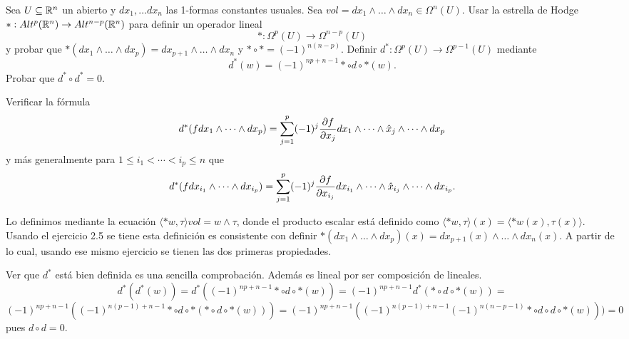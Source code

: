 \documentclass[twoside]{article}
\begin{document}
\begin{ejercicio}{3.2}
Sea $U\subseteq\mathbb{R}^n$ un abierto y $dx_1,\dots dx_n$ las 1-formas constantes usuales. Sea $vol=dx_1\land\dots\land dx_n\in\Omega^n(U)$. Usar la estrella de Hodge $*:Alt^p(\mathbb{R}^n)\to Alt^{n-p}(\mathbb{R}^n)$ para definir un operador lineal  $$*:\Omega^p(U)\to\Omega^{n-p}(U)$$
y probar que $*(dx_1\land\dots\land dx_p)=dx_{p+1}\land\dots\land dx_n$ y $*\circ *=(-1)^{n(n-p)}$. Definir $d^*:\Omega^p(U)\to\Omega^{p-1}(U)$ mediante
$$d^*(w)=(-1)^{np+n-1}*\circ d\circ *(w).$$
Probar que $d^*\circ d^*=0$. 

Verificar la fórmula 
\[
d^*(fdx_1\land\dots\land dx_p)=\sum_{j=1}^p(-1)^j\frac{\partial f}{\partial x_j}dx_1\land\dots\land\hat{x}_j\land\dots\land dx_p
\]
y más generalmente para $1\leq i_1<\cdots <i_p\leq n$ que 
\[
d^*(fdx_{i_1}\land\dots\land dx_{i_p})=\sum_{j=1}^p(-1)^j\frac{\partial f}{\partial x_{i_j}}dx_{i_1}\land\dots\land\hat{x}_{i_j}\land\dots\land dx_{i_p}.
\]
\end{ejercicio}
\begin{solucion}
Lo definimos mediante la ecuación $\langle *w,\tau\rangle vol =w\land\tau$, donde el producto escalar está definido como $\langle *w,\tau\rangle(x)=\langle *w(x), \tau(x)\rangle$. Usando el ejercicio 2.5 se tiene esta definición es consistente con definir $*(dx_1\land\dots\land dx_p)(x)=dx_{p+1}(x)\land\dots\land dx_n(x)$. A partir de lo cual, usando ese mismo ejercicio se tienen las dos primeras propiedades.

Ver que $d^*$ está bien definida es una sencilla comprobación. Además es lineal por ser composición de lineales.
\[
d^*(d^*(w))=d^*((-1)^{np+n-1}*\circ d\circ *(w))=(-1)^{np+n-1}d^*(*\circ d\circ *(w))=
\]
\[
(-1)^{np+n-1}((-1)^{n(p-1)+n-1}*\circ d\circ *(*\circ d\circ *(w)))=(-1)^{np+n-1}((-1)^{n(p-1)+n-1}(-1)^{n(n-p-1)}*\circ d\circ d\circ *(w)))=0
\]
pues $d\circ d=0$.
\end{solucion}
\newpage

\begin{ejercicio}{3.3}
\end{ejercicio}
\begin{solucion}
\end{solucion}
\newpage

\begin{ejercicio}{3.4}

\end{ejercicio}
\begin{solucion}

\end{solucion}
\end{document}
